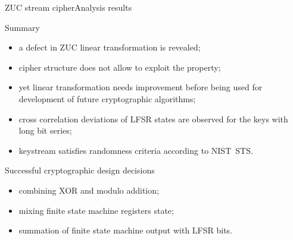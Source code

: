 \documentclass[10pt, ucs]{beamer}
\begin{document}
\begin{frame}{ZUC stream cipher}{Analysis results}
    \begin{block}{Summary}
        \begin{itemize}
            \item a defect in ZUC linear transformation is revealed;
            \item cipher structure does not allow to exploit the property;
            \item yet linear transformation needs improvement before being used
                for development of future cryptographic algorithms;
            \item cross correlation deviations of LFSR states are observed for
                the keys with long bit series;
            \item keystream satisfies randomness criteria according to NIST~STS.
        \end{itemize}
    \end{block}
    \begin{block}{Successful cryptographic design decisions}
        \begin{itemize}
            \item combining XOR and modulo addition;
            \item mixing finite state machine registers state;
            \item summation of finite state machine output with LFSR bits.
        \end{itemize}
    \end{block}
\end{frame}
\end{document}
